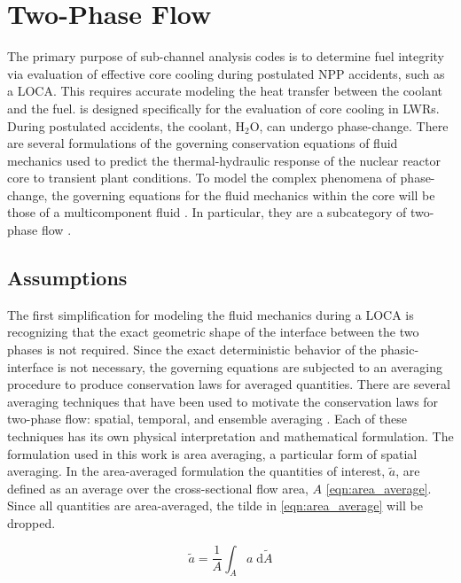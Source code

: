 \section{Two-Phase Flow}
\label{sect:two_phase_flow}
The primary purpose of sub-channel analysis codes is to determine fuel integrity via evaluation of effective core cooling during postulated NPP accidents, such as a LOCA.
This requires accurate modeling the heat transfer between the coolant and the fuel. 
\cobra{} is designed specifically for the evaluation of core cooling in LWRs.
During postulated accidents, the coolant, H$_2$O, can undergo phase-change.
There are several formulations of the governing conservation equations of fluid mechanics used to predict the thermal-hydraulic response of the nuclear reactor core to transient plant conditions.
To model the complex phenomena of phase-change, the governing equations for the fluid mechanics within the core will be those of a multicomponent fluid \cite{Drew1998}.
In particular, they are a subcategory of two-phase flow \cite{Todreas2011, Stewart1984, Ishii1984}.

\subsection{Assumptions}
\label{subsect:assumptions}

The first simplification for modeling the fluid mechanics during a LOCA is recognizing that the exact geometric shape of the interface between the two phases is not required.
Since the exact deterministic behavior of the phasic-interface is not necessary, the governing equations are subjected to an averaging procedure to produce conservation laws for averaged quantities.
There are several averaging techniques that have been used to motivate the conservation laws for two-phase flow: spatial, temporal, and ensemble averaging \cite{Drew1998, Todreas2011}.
Each of these techniques has its own physical interpretation and mathematical formulation.
The formulation used in this work is area averaging, a particular form of spatial averaging.
In the area-averaged formulation the quantities of interest, $\tilde{a}$, are defined as an average over the cross-sectional flow area, $A$ \eqref{eqn:area_average}.
Since all quantities are area-averaged, the tilde in \eqref{eqn:area_average} will be dropped.

\begin{equation}
\label{eqn:area_average}
\tilde{a} = \frac{1}{A}\int_{A} a \;\mathrm{d}\tilde{A}
\end{equation}

